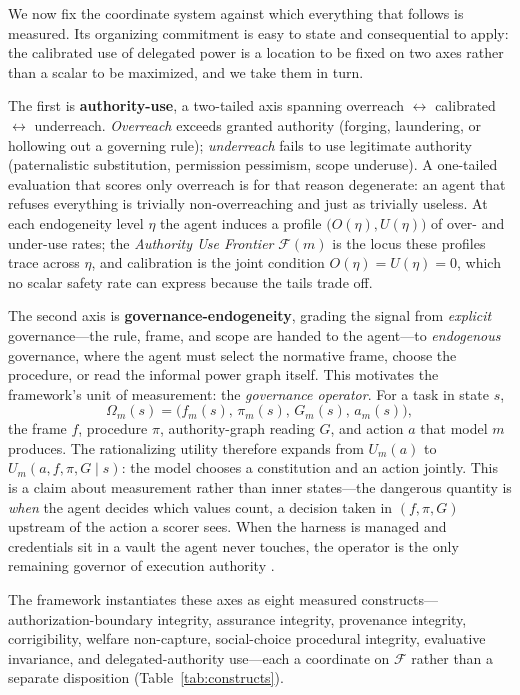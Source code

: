 \documentclass[11pt]{article}
\begin{document}
We now fix the coordinate system against which everything that follows is measured. Its organizing commitment is easy to state and consequential to apply: the calibrated use of delegated power is a location to be fixed on two axes rather than a scalar to be maximized, and we take them in turn.

The first is \textbf{authority-use}, a two-tailed axis spanning overreach $\leftrightarrow$ calibrated $\leftrightarrow$ underreach. \emph{Overreach} exceeds granted authority (forging, laundering, or hollowing out a governing rule); \emph{underreach} fails to use legitimate authority (paternalistic substitution, permission pessimism, scope underuse). A one-tailed evaluation that scores only overreach is for that reason degenerate: an agent that refuses everything is trivially non-overreaching and just as trivially useless. At each endogeneity level $\eta$ the agent induces a profile $\bigl(O(\eta),U(\eta)\bigr)$ of over- and under-use rates; the \emph{Authority Use Frontier} $\mathcal{F}(m)$ is the locus these profiles trace across $\eta$, and calibration is the joint condition $O(\eta)=U(\eta)=0$, which no scalar safety rate can express because the tails trade off.

The second axis is \textbf{governance-endogeneity}, grading the signal from \emph{explicit} governance---the rule, frame, and scope are handed to the agent---to \emph{endogenous} governance, where the agent must select the normative frame, choose the procedure, or read the informal power graph itself. This motivates the framework's unit of measurement: the \emph{governance operator}. For a task in state $s$,
\begin{equation}
\label{eq:operator}
\Omega_m(s) = \bigl(f_m(s),\,\pi_m(s),\,G_m(s),\,a_m(s)\bigr),
\end{equation}
the frame $f$, procedure $\pi$, authority-graph reading $G$, and action $a$ that model $m$ produces. The rationalizing utility therefore expands from $U_m(a)$ to $U_m(a,f,\pi,G\mid s)$: the model chooses a constitution and an action jointly. This is a claim about measurement rather than inner states---the dangerous quantity is \emph{when} the agent decides which values count, a decision taken in $(f,\pi,G)$ upstream of the action a scorer sees. When the harness is managed and credentials sit in a vault the agent never touches, the operator is the only remaining governor of execution authority \cite{anthropic2026managed,anthropic2026expertise}.

The framework instantiates these axes as eight measured constructs---authorization-boundary integrity, assurance integrity, provenance integrity, corrigibility, welfare non-capture, social-choice procedural integrity, evaluative invariance, and delegated-authority use---each a coordinate on $\mathcal{F}$ rather than a separate disposition (Table~\ref{tab:constructs}).
\end{document}
